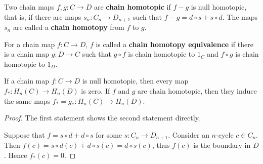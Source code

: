 \begin{defn} Two chain maps $f,g:C\rightarrow D$ are \textbf{chain homotopic} if $f-g$ is null homotopic, that is, if there are maps $s_n:C_n\rightarrow D_{n+1}$ such that $f-g=d\circ s+s\circ d$. The maps $s_n$ are called a \textbf{chain homotopy} from $f$ to $g$.
\end{defn}

\begin{defn} For a chain map $f:C\rightarrow D$, $f$ is called a \textbf{chain homotopy equivalence} if there is a chain map $g:D\rightarrow C$ such that $g\circ f$ is chain homotopic to $1_C$ and $f\circ g$ is chain homotopic to $1_D$.
\end{defn}

\begin{lemma} If a chain map $f:C\rightarrow D$ is null homotopic, then every map $f_*:H_n(C)\rightarrow H_n(D)$ is zero. If $f$ and $g$ are chain homotopic, then they induce the same maps $f_*=g_*:H_n(C)\rightarrow H_n(D)$.
\end{lemma}
\begin{proof}
The first statement shows the second statement directly.

Suppose that $f=s\circ d+d\circ s$ for some $s:C_n\rightarrow D_{n+1}$. Consider an $n$-cycle $c\in C_n$. Then $f(c)=s\circ d(c)+d\circ s(c)=d\circ s(c)$, thus $f(c)$ is the boundary in $D$. Hence $f_*(c)=0$.
\end{proof}

